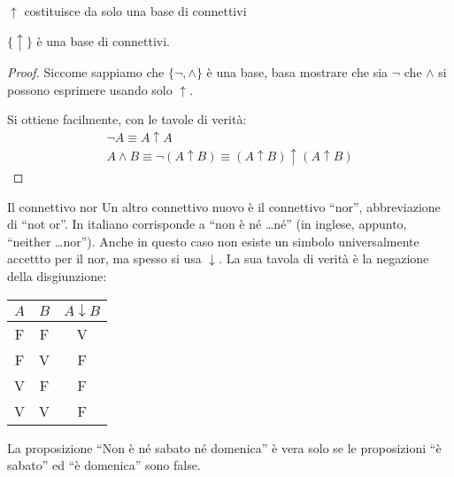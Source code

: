 \documentclass[aspectratio=169,10pt,dvipsnames,xcolor=table,handout]{beamer}
\begin{document}
\begin{frame}{$\uparrow$ costituisce da solo una base di connettivi}
    \begin{theorem}
        $\{ \uparrow \}$ è una base di connettivi.
    \end{theorem}
    \begin{proof}
     Siccome sappiamo che $\{\neg, \wedge\}$ è una base, basa mostrare che sia $\neg$ che $\wedge$ si possono esprimere usando solo $\uparrow$.

    \medskip
    Si ottiene facilmente, con le tavole di verità:
    \begin{gather*}
        \neg A \equiv A \uparrow A\\
        A \wedge B \equiv \neg(A \uparrow B) \equiv (A \uparrow B) \uparrow (A \uparrow B)
    \end{gather*}
    \end{proof}
\end{frame}

\begin{frame}{Il connettivo nor}
    Un altro connettivo nuovo è il connettivo ``\alert{nor}'', abbreviazione di ``not or''. In italiano corrisponde a ``\alert{non è né \ldots né}'' (in inglese, appunto, ``neither \ldots nor''). Anche in questo caso non esiste un simbolo universalmente accettto per il nor, ma spesso si usa $\downarrow$. La sua tavola di verità è la negazione della disgiunzione:

    \medskip
    \begin{center}
        \begin{tabular}{c|c||c}
            $A$ & $B$ & $A \downarrow B$ \\
            \hline
            F   & F   & V         \\
            F   & V   & F        \\
            V   & F   & F         \\
            V   & V   & F
        \end{tabular}
    \end{center}

    \begin{example}
        La proposizione ``Non è né sabato né domenica'' è vera solo se le proposizioni ``è sabato'' ed ``è domenica'' sono false.
    \end{example}
\end{frame}
\end{document}
